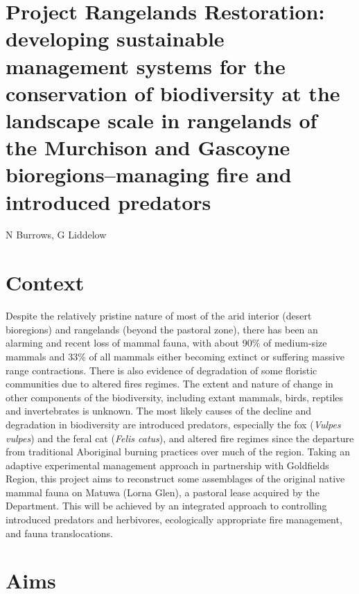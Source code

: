 \documentclass[version=last,
    paper=a4, %
    10pt, %
    usenames,
    dvipsnames,
    oneside, %
    headings=openany, %
    DIV=15 %
]{scrbook}
\begin{document}
\section*{Project Rangelands Restoration: developing sustainable management
systems for the conservation of biodiversity at the landscape scale in
rangelands of the Murchison and Gascoyne bioregions--managing fire and
introduced predators
}

N Burrows, G Liddelow



\section*{Context}

Despite the relatively pristine nature of most of the arid interior
(desert bioregions) and rangelands (beyond the pastoral zone), there has
been an alarming and recent loss of mammal fauna, with about 90\% of
medium-size mammals and 33\% of all mammals either becoming extinct or
suffering massive range contractions. There is also evidence of
degradation of some floristic communities due to altered fires regimes.
The extent and nature of change in other components of the biodiversity,
including extant mammals, birds, reptiles and invertebrates is unknown.
The most likely causes of the decline and degradation in biodiversity
are introduced predators, especially the fox (\emph{Vulpes vulpes}) and
the feral cat (\emph{Felis catus}), and altered fire regimes since the
departure from traditional Aboriginal burning practices over much of the
region. Taking an adaptive experimental management approach in
partnership with Goldfields Region, this project aims to reconstruct
some assemblages of the original native mammal fauna on Matuwa (Lorna
Glen), a pastoral lease acquired by the Department. This will be
achieved by an integrated approach to controlling introduced predators
and herbivores, ecologically appropriate fire management, and fauna
translocations.




\section*{Aims}
\end{document}
